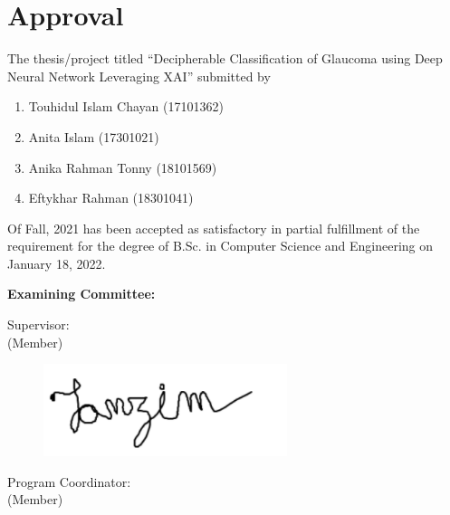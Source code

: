 \section*{Approval}

The thesis/project titled “Decipherable Classification of Glaucoma using Deep Neural Network Leveraging XAI” submitted by 
\begin{enumerate}
  \item Touhidul Islam Chayan (17101362)
  \item Anita Islam (17301021)
  \item Anika Rahman Tonny (18101569) 
  \item Eftykhar Rahman (18301041)
\end{enumerate}

\noindent Of Fall, 2021 has been accepted as satisfactory in partial fulfillment of the requirement for the degree of B.Sc. in Computer Science and Engineering on January 18, 2022. 

\noindent \textbf{Examining Committee:}

\noindent Supervisor:\\
\noindent (Member)
\begin{center}
\begin{figure}[hbt!]
\raggedleft
\includegraphics[scale=0.3]{images/tanjimRezaSir.png}\ \ \ \ \ \ \ \ \ \ \ \ \ \ \ \ \ \
\end{figure}    
    \hspace{7cm}  \hspace{1cm} 
\end{center}

\noindent Program Coordinator:\\
(Member)
\begin{center}
    \hspace{7cm}  \hspace{1cm} 
\end{center}

